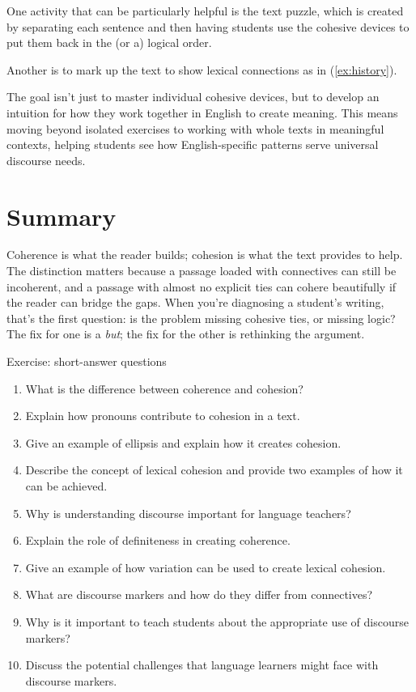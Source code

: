 One activity that can be particularly helpful is the text puzzle, which is created by separating each sentence and then having students use the cohesive devices to put them back in the (or a) logical order.

Another is to mark up the text to show lexical connections as in (\ref{ex:history}). 

The goal isn't just to master individual cohesive devices, but to develop an intuition for how they work together in English to create meaning. This means moving beyond isolated exercises to working with whole texts in meaningful contexts, helping students see how English-specific patterns serve universal discourse needs.

\section{Summary}

Coherence is what the reader builds; cohesion is what the text provides to help. The distinction matters because a passage loaded with connectives can still be incoherent, and a passage with almost no explicit ties can cohere beautifully if the reader can bridge the gaps. When you're diagnosing a student's writing, that's the first question: is the problem missing cohesive ties, or missing logic? The fix for one is a \emph{but}; the fix for the other is rethinking the argument.


\begin{tblslineshorizontal}{Exercise: short-answer questions}

\begin{enumerate}[noitemsep]
    \item What is the difference between coherence and cohesion?
    \item Explain how pronouns contribute to cohesion in a text.
    \item Give an example of ellipsis and explain how it creates cohesion.
    \item Describe the concept of lexical cohesion and provide two examples of how it can be achieved.
    \item Why is understanding discourse important for language teachers?
    \item Explain the role of definiteness in creating coherence.
    \item Give an example of how variation can be used to create lexical cohesion.
    \item What are discourse markers and how do they differ from connectives?
    \item Why is it important to teach students about the appropriate use of discourse markers?
    \item Discuss the potential challenges that language learners might face with discourse markers.
\end{enumerate}

\end{tblslineshorizontal}

